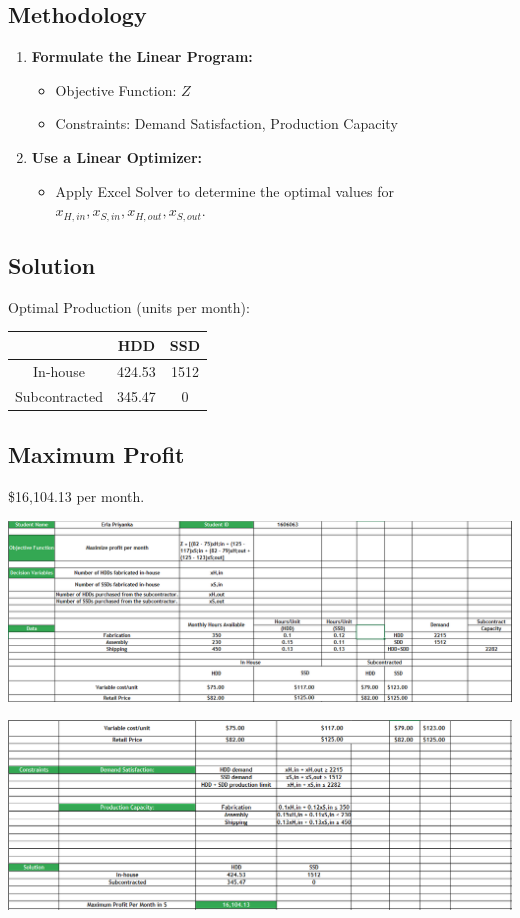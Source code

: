 \documentclass[10pt]{article}
\begin{document}
\subsection*{Methodology}

\begin{enumerate}
    \item \textbf{Formulate the Linear Program:}
    \begin{itemize}
        \item Objective Function: \( Z \)
        \item Constraints: Demand Satisfaction, Production Capacity
    \end{itemize}
    
    \item \textbf{Use a Linear Optimizer:}
    \begin{itemize}
        \item Apply Excel Solver  to determine the optimal values for \( x_{H,in}, x_{S,in}, x_{H,out}, x_{S,out} \).
    \end{itemize}
\end{enumerate}

\subsection*{Solution}
Optimal Production (units per month):

\begin{tabular}{|c|c|c|}
\hline
 & HDD & SSD \\
\hline
In-house & 424.53 & 1512 \\
Subcontracted & 345.47 & 0 \\
\hline
\end{tabular}

\subsection*{Maximum Profit}
\$16,104.13 per month.
\newpage

\begin{center}
    \includegraphics[width=\textwidth]{Q2.PNG} 
\end{center} 
\vspace{30pt}

\begin{center}
    \includegraphics[width=\textwidth]{Q22.PNG} 
\end{center} 
\end{document}
